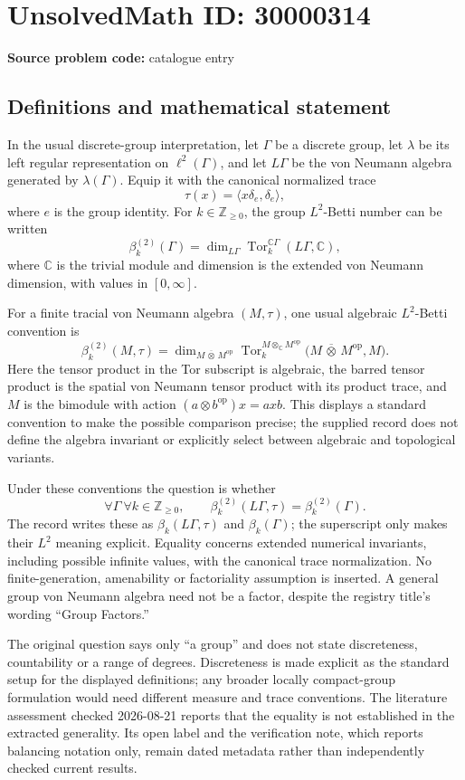 \documentclass[11pt]{article}
\newcommand{\Z}{\mathbb{Z}}
\newcommand{\C}{\mathbb{C}}
\begin{document}
\section*{UnsolvedMath ID: 30000314}
\textbf{Source problem code:} catalogue entry
\subsection{Definitions and mathematical statement}
In the usual discrete-group interpretation, let \(\Gamma\) be a discrete group, let \(\lambda\) be its left regular representation on \(\ell^2(\Gamma)\), and let \(L\Gamma\) be the von Neumann algebra generated by \(\lambda(\Gamma)\). Equip it with the canonical normalized trace
\[
 \tau(x)=\langle x\delta_e,\delta_e\rangle,
\]
where \(e\) is the group identity. For \(k\in\Z_{\geq0}\), the group \(L^2\)-Betti number can be written
\[
 \beta_k^{(2)}(\Gamma)
 =\dim_{L\Gamma}\operatorname{Tor}^{\C\Gamma}_k(L\Gamma,\C),
\]
where \(\C\) is the trivial module and dimension is the extended von Neumann dimension, with values in \([0,\infty]\).

For a finite tracial von Neumann algebra \((M,\tau)\), one usual algebraic \(L^2\)-Betti convention is
\[
 \beta_k^{(2)}(M,\tau)
 =\dim_{M\,\overline\otimes\,M^{\mathrm{op}}}
 \operatorname{Tor}^{M\otimes_{\C}M^{\mathrm{op}}}_k
 \bigl(M\,\overline\otimes\,M^{\mathrm{op}},M\bigr).
\]
Here the tensor product in the Tor subscript is algebraic, the barred tensor product is the spatial von Neumann tensor product with its product trace, and \(M\) is the bimodule with action \((a\otimes b^{\mathrm{op}})x=axb\). This displays a standard convention to make the possible comparison precise; the supplied record does not define the algebra invariant or explicitly select between algebraic and topological variants.

Under these conventions the question is whether
\[
 \forall\Gamma\ \forall k\in\Z_{\geq0},\qquad
 \beta_k^{(2)}(L\Gamma,\tau)=\beta_k^{(2)}(\Gamma).
\]
The record writes these as \(\beta_k(L\Gamma,\tau)\) and \(\beta_k(\Gamma)\); the superscript only makes their \(L^2\) meaning explicit. Equality concerns extended numerical invariants, including possible infinite values, with the canonical trace normalization. No finite-generation, amenability or factoriality assumption is inserted. A general group von Neumann algebra need not be a factor, despite the registry title's wording ``Group Factors.''

The original question says only ``a group'' and does not state discreteness, countability or a range of degrees. Discreteness is made explicit as the standard setup for the displayed definitions; any broader locally compact-group formulation would need different measure and trace conventions. The literature assessment checked 2026-08-21 reports that the equality is not established in the extracted generality. Its open label and the verification note, which reports balancing notation only, remain dated metadata rather than independently checked current results.
\end{document}
